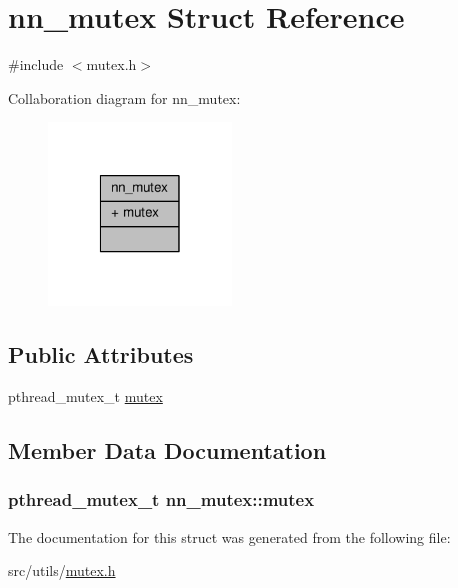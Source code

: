 \hypertarget{structnn__mutex}{}\section{nn\+\_\+mutex Struct Reference}
\label{structnn__mutex}


{\ttfamily \#include $<$mutex.\+h$>$}



Collaboration diagram for nn\+\_\+mutex\+:\nopagebreak
\begin{figure}[H]
\begin{center}
\leavevmode
\includegraphics[width=138pt]{structnn__mutex__coll__graph}
\end{center}
\end{figure}
\subsection*{Public Attributes}
\begin{DoxyCompactItemize}
\item 
pthread\+\_\+mutex\+\_\+t \hyperlink{structnn__mutex_a8fcb2bd2eb9fb48a29e362321360a9ec}{mutex}
\end{DoxyCompactItemize}


\subsection{Member Data Documentation}
\subsubsection[{mutex}]{\setlength{\rightskip}{0pt plus 5cm}pthread\+\_\+mutex\+\_\+t nn\+\_\+mutex\+::mutex}\hypertarget{structnn__mutex_a8fcb2bd2eb9fb48a29e362321360a9ec}{}\label{structnn__mutex_a8fcb2bd2eb9fb48a29e362321360a9ec}


The documentation for this struct was generated from the following file\+:\begin{DoxyCompactItemize}
\item 
src/utils/\hyperlink{mutex_8h}{mutex.\+h}\end{DoxyCompactItemize}
